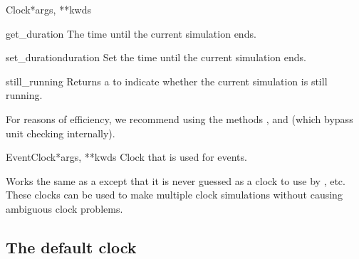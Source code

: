 \documentclass[letterpaper,10pt,english]{manual}
\begin{document}
\begin{classdesc}{Clock}{*args, **kwds}
\hypertarget{brian.Clock.get_duration}{}\begin{methoddesc}{get\_duration}{}
The time until the current simulation ends.
\end{methoddesc}

\hypertarget{brian.Clock.set_duration}{}\begin{methoddesc}{set\_duration}{duration}
Set the time until the current simulation ends.
\end{methoddesc}

\hypertarget{brian.Clock.still_running}{}\begin{methoddesc}{still\_running}{}
Returns a  to indicate whether the current
simulation is still running.
\end{methoddesc}

For reasons of efficiency, we recommend using the methods
\hyperlink{brian.Clock.tick}{}, \hyperlink{brian.Clock.set_duration}{} and \hyperlink{brian.Clock.still_running}{}
(which bypass unit checking internally).
\end{classdesc}

\hypertarget{brian.EventClock}{}\begin{classdesc}{EventClock}{*args, **kwds}
Clock that is used for events.

Works the same as a \hyperlink{brian.Clock}{} except that it is never guessed as a clock to
use by \hyperlink{brian.NeuronGroup}{}, etc. These clocks can be used to make multiple clock
simulations without causing ambiguous clock problems.
\end{classdesc}

\subsection{The default clock}
\end{document}
